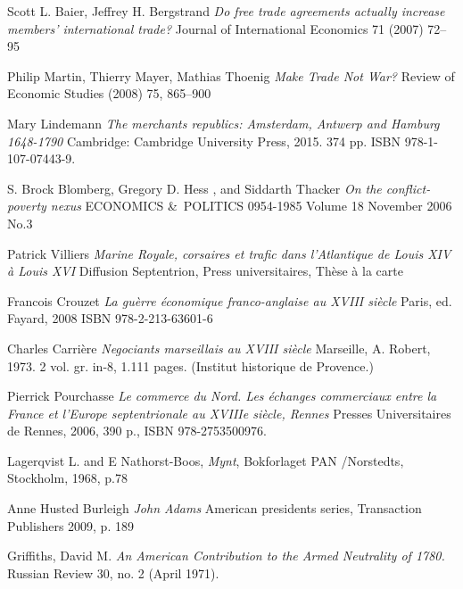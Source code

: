 \documentclass[12pt,a4paper,titlepage,english]{article}
\begin{document}
\begin{thebibliography}{9}
\bibitem{}
Scott L. Baier, Jeffrey H. Bergstrand
\textit{Do free trade agreements actually increase members' international trade?} 
Journal of International Economics 71 (2007) 72–95

\bibitem{}
Philip Martin, Thierry Mayer, Mathias Thoenig
\textit{Make Trade Not War?} 
Review of Economic Studies (2008) 75, 865–900

\bibitem{}
Mary Lindemann
\textit{The merchants republics: Amsterdam, Antwerp and Hamburg 1648-1790} 
Cambridge:	Cambridge University Press, 2015. 374 pp. ISBN 978-1-107-07443-9.

\bibitem{}
S. Brock Blomberg, Gregory D. Hess , and Siddarth Thacker
\textit{On the conflict-poverty nexus} 
ECONOMICS \&\ POLITICS 0954-1985 Volume 18 November 2006 No.3

\bibitem{}
Patrick Villiers
\textit{Marine Royale, corsaires et trafic dans l'Atlantique de Louis XIV à Louis XVI} 
Diffusion Septentrion, Press universitaires, Thèse à la carte

\bibitem{}
Francois Crouzet
\textit{La guèrre économique franco-anglaise au XVIII siècle} 
Paris, ed. Fayard, 2008 ISBN 978-2-213-63601-6

\bibitem{}
Charles Carrière
\textit{Negociants marseillais au XVIII siècle} 
Marseille, A. Robert, 1973. 2 vol. gr. in-8, 1.111 pages. (Institut historique de Provence.)

\bibitem{}
Pierrick Pourchasse
\textit{Le commerce du Nord. Les échanges commerciaux entre la France et l’Europe septentrionale au XVIIIe siècle, Rennes} Presses Universitaires de Rennes, 2006, 390 p., ISBN 978-2753500976.

\bibitem{}
Lagerqvist L. and E Nathorst-Boos, 
\textit{Mynt}, Bokforlaget PAN /Norstedts, Stockholm, 1968, p.78

\bibitem{}
Anne Husted Burleigh
\textit{John Adams} American presidents series, Transaction Publishers 2009, p. 189

\bibitem{}
Griffiths, David M. \textit{An American Contribution to the Armed Neutrality of 1780.} Russian Review 30, no. 2 (April 1971).

\end{thebibliography}
\end{document}
